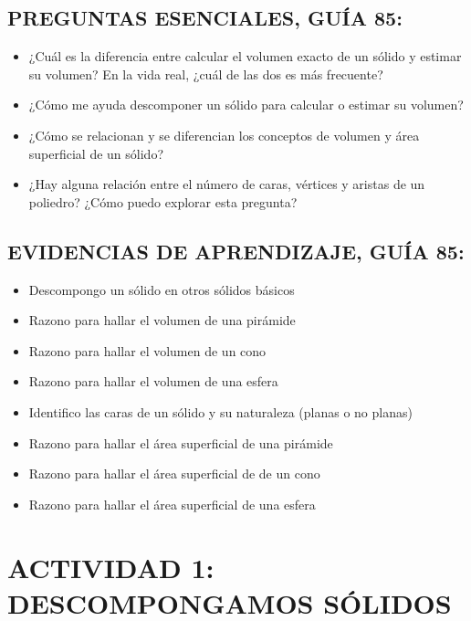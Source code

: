 \documentclass[12pt,a4paper]{article}
\begin{document}
\subsection*{PREGUNTAS ESENCIALES, GUÍA 85:}

\begin{itemize}[nosep]
    \item ¿Cuál es la diferencia entre calcular el volumen exacto de un sólido y estimar su volumen? En la vida real, ¿cuál de las dos es más frecuente?
    \item ¿Cómo me ayuda descomponer un sólido para calcular o estimar su volumen?
    \item ¿Cómo se relacionan y se diferencian los conceptos de volumen y área superficial de un sólido?
    \item ¿Hay alguna relación entre el número de caras, vértices y aristas de un poliedro? ¿Cómo puedo explorar esta pregunta?
\end{itemize}

\subsection*{EVIDENCIAS DE APRENDIZAJE, GUÍA 85:}

\begin{itemize}[nosep]
    \item Descompongo un sólido en otros sólidos básicos
    \item Razono para hallar el volumen de una pirámide
    \item Razono para hallar el volumen de un cono
    \item Razono para hallar el volumen de una esfera
    \item Identifico las caras de un sólido y su naturaleza (planas o no planas)
    \item Razono para hallar el área superficial de una pirámide
    \item Razono para hallar el área superficial de de un cono
    \item Razono para hallar el área superficial de una esfera
\end{itemize}

\vspace{4mm}


\section*{ACTIVIDAD 1: DESCOMPONGAMOS SÓLIDOS}
\end{document}
